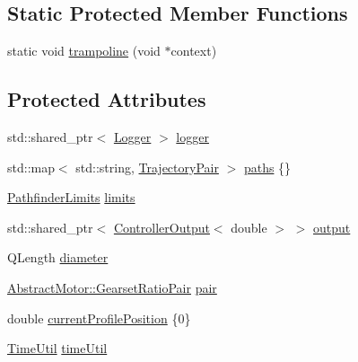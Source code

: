 \subsection*{Static Protected Member Functions}
\begin{DoxyCompactItemize}
\item 
static void \mbox{\hyperlink{classokapi_1_1AsyncLinearMotionProfileController_a9b49662a9d4107ebe1b4799934e472a3}{trampoline}} (void $\ast$context)
\end{DoxyCompactItemize}
\subsection*{Protected Attributes}
\begin{DoxyCompactItemize}
\item 
std\+::shared\+\_\+ptr$<$ \mbox{\hyperlink{classokapi_1_1Logger}{Logger}} $>$ \mbox{\hyperlink{classokapi_1_1AsyncLinearMotionProfileController_abfdbc29ef850cf20ed15b3c1398c7cc1}{logger}}
\item 
std\+::map$<$ std\+::string, \mbox{\hyperlink{structokapi_1_1AsyncLinearMotionProfileController_1_1TrajectoryPair}{Trajectory\+Pair}} $>$ \mbox{\hyperlink{classokapi_1_1AsyncLinearMotionProfileController_a955697ca2debe00771c8039b3df328f0}{paths}} \{\}
\item 
\mbox{\hyperlink{structokapi_1_1PathfinderLimits}{Pathfinder\+Limits}} \mbox{\hyperlink{classokapi_1_1AsyncLinearMotionProfileController_a9d2bb17d4a934984d488b3b4fba11c6e}{limits}}
\item 
std\+::shared\+\_\+ptr$<$ \mbox{\hyperlink{classokapi_1_1ControllerOutput}{Controller\+Output}}$<$ double $>$ $>$ \mbox{\hyperlink{classokapi_1_1AsyncLinearMotionProfileController_a5a718fd422ce52e613e1d231910860a9}{output}}
\item 
Q\+Length \mbox{\hyperlink{classokapi_1_1AsyncLinearMotionProfileController_a0b3cafe78cb551d68c2cb6ac31d1a753}{diameter}}
\item 
\mbox{\hyperlink{structokapi_1_1AbstractMotor_1_1GearsetRatioPair}{Abstract\+Motor\+::\+Gearset\+Ratio\+Pair}} \mbox{\hyperlink{classokapi_1_1AsyncLinearMotionProfileController_a3727388c1310a387524b7d38d5c0b1b0}{pair}}
\item 
double \mbox{\hyperlink{classokapi_1_1AsyncLinearMotionProfileController_a94c203e635765357bd825ffc4d061741}{current\+Profile\+Position}} \{0\}
\item 
\mbox{\hyperlink{classokapi_1_1TimeUtil}{Time\+Util}} \mbox{\hyperlink{classokapi_1_1AsyncLinearMotionProfileController_a320e12b446817ebc8dfb01c6bb36e3cb}{time\+Util}}

\end{DoxyCompactItemize}
